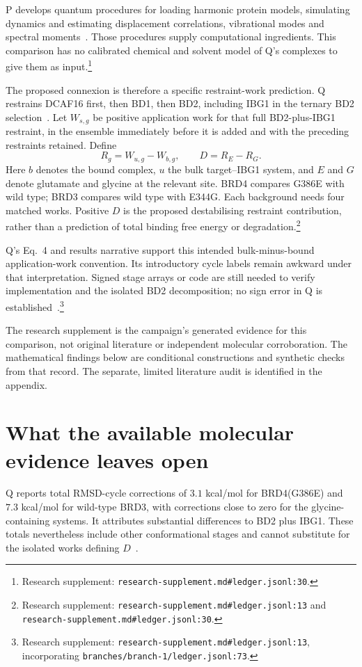 \documentclass{article}
\begin{document}
P develops quantum procedures for loading harmonic protein models, simulating dynamics and estimating displacement correlations, vibrational modes and spectral moments~\cite{P}. Those procedures supply computational ingredients. This comparison has no calibrated chemical and solvent model of Q's complexes to give them as input.\footnote{Research supplement: \nolinkurl{research-supplement.md\#ledger.jsonl:30}.}

The proposed connexion is therefore a specific restraint-work prediction. Q restrains DCAF16 first, then BD1, then BD2, including IBG1 in the ternary BD2 selection~\cite{Q}. Let \(W_{s,g}\) be positive application work for that full BD2-plus-IBG1 restraint, in the ensemble immediately before it is added and with the preceding restraints retained. Define
\[
 R_g=W_{u,g}-W_{b,g},\qquad D=R_E-R_G.
\]
Here \(b\) denotes the bound complex, \(u\) the bulk target--IBG1 system, and \(E\) and \(G\) denote glutamate and glycine at the relevant site. BRD4 compares G386E with wild type; BRD3 compares wild type with E344G. Each background needs four matched works. Positive \(D\) is the proposed destabilising restraint contribution, rather than a prediction of total binding free energy or degradation.\footnote{Research supplement: \nolinkurl{research-supplement.md\#ledger.jsonl:13} and \nolinkurl{research-supplement.md\#ledger.jsonl:30}.}

Q's Eq.~4 and results narrative support this intended bulk-minus-bound application-work convention. Its introductory cycle labels remain awkward under that interpretation. Signed stage arrays or code are still needed to verify implementation and the isolated BD2 decomposition; no sign error in Q is established~\cite{Q}.\footnote{Research supplement: \nolinkurl{research-supplement.md\#ledger.jsonl:13}, incorporating \nolinkurl{branches/branch-1/ledger.jsonl:73}.}

The research supplement is the campaign's generated evidence for this comparison, not original literature or independent molecular corroboration. The mathematical findings below are conditional constructions and synthetic checks from that record. The separate, limited literature audit is identified in the appendix.

\section{What the available molecular evidence leaves open}

Q reports total RMSD-cycle corrections of \(3.1\) kcal/mol for BRD4(G386E) and \(7.3\) kcal/mol for wild-type BRD3, with corrections close to zero for the glycine-containing systems. It attributes substantial differences to BD2 plus IBG1. These totals nevertheless include other conformational stages and cannot substitute for the isolated works defining \(D\)~\cite{Q}.
\end{document}
